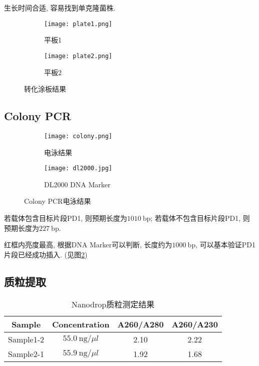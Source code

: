 \documentclass{article}
\begin{document}
生长时间合适, 容易找到单克隆菌株.

\begin{figure}[htbp]
    \centering
    \begin{subfigure}[b]{0.49\textwidth}
      \texttt{[image: plate1.png]}
      \caption{平板1}
    \end{subfigure}
    \hfill
    \begin{subfigure}[b]{0.49\textwidth}
      \texttt{[image: plate2.png]}
      \caption{平板2}
    \end{subfigure}
    \caption{转化涂板结果}
    \label{fig:plate}
\end{figure}

\subsection{Colony PCR}

\begin{figure}[htbp]
    \centering
    \begin{subfigure}[b]{0.65\textwidth}
      \texttt{[image: colony.png]}
      \caption{电泳结果}
    \end{subfigure}
    \hfill
    \begin{subfigure}[b]{0.3\textwidth}
        \texttt{[image: dl2000.jpg]}
        \caption{DL2000 DNA Marker}
    \end{subfigure}
    \caption{Colony PCR电泳结果}
    \label{fig:gel2}
\end{figure}

若载体包含目标片段PD1, 则预期长度为$1010\ \mbox{bp}$; 若载体不包含目标片段PD1, 则预期长度为$227\ \mbox{bp}$.

红框内亮度最高, 根据DNA Marker可以判断, 长度约为$1000\ \mbox{bp}$, 可以基本验证PD1片段已经成功插入. (见图\ref{fig:gel2})

\newpage

\subsection{质粒提取}

\begin{table}
    \centering
    \begin{tabular}{cccc}
        \toprule
        Sample & Concentration & A260/A280 & A260/A230 \\
        \midrule
        Sample1-2 & $55.0\ \mbox{ng}/\mu l$ & 2.10 & 2.22 \\
        Sample2-1 & $55.9\ \mbox{ng}/\mu l$ & 1.92 & 1.68 \\
        \bottomrule
    \end{tabular}
    \caption{Nanodrop质粒测定结果}
    \label{tab:extraction}
\end{table}
\end{document}
